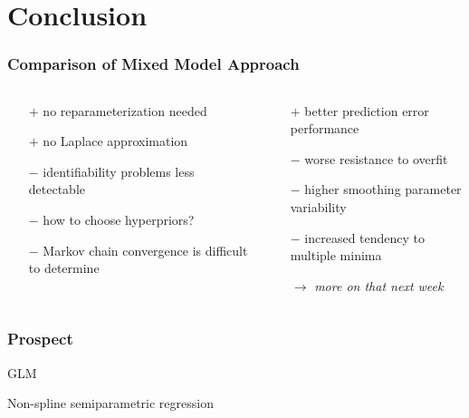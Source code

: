 \documentclass[final]{beamer}
\begin{document}
\section{Conclusion}


\begin{frame}
\frametitle{Comparison of Mixed Model Approach}
\begin{columns}[T]
\begin{column}{0.5\textwidth}
\centering{\textcolor{beamer@postercolour}{Fully Bayesian approach \\(MCMC)}}
\begin{itemize}
\item[$+$] no reparameterization needed
\item[$+$] no Laplace approximation
\item[$-$] identifiability problems less detectable
\item[$-$] how to choose hyperpriors?
\item[$-$] Markov chain convergence is difficult to determine
\end{itemize}
\end{column}
\begin{column}{0.5\textwidth}
\centering{\textcolor{beamer@postercolour}{Prediction error methods \\ (AIC, GCV)}}
\begin{itemize}
\item[$+$] better prediction error performance 
\item[$-$] worse resistance to overfit
\item[$-$] higher smoothing parameter variability
\item[$-$] increased tendency to multiple minima
\item[$\rightarrow$] \textit{more on that next week}
\end{itemize}
\end{column}
\end{columns}
\end{frame}


\begin{frame}
\frametitle{Prospect}

GLM

Non-spline semiparametric regression

\end{frame}
\end{document}
